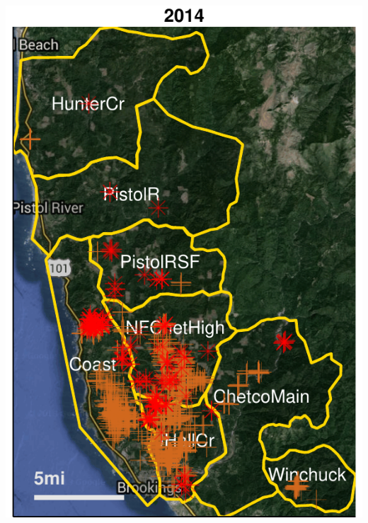 \documentclass{beamer}\usepackage[]{graphicx}\usepackage[]{color}
\begin{document}
\begin{frame}[allowpagebreak,T]
\begin{columns}[allowpagebreak,T]
\begin{column}{0.5\paperwidth}
{				\includegraphics[keepaspectratio,width=0.48\paperwidth]{figure/2014-1.pdf}
			}
		\end{column}
	\end{columns}

\end{frame}


\end{document}
